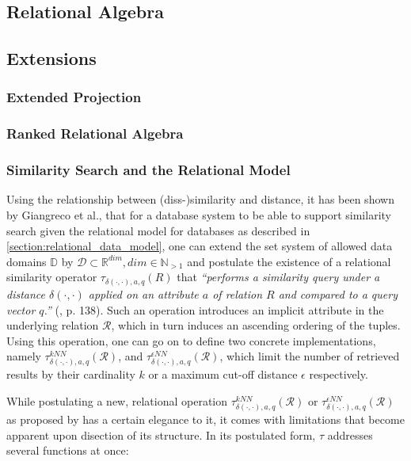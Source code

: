 \subsection{Relational Algebra}
\label{section:rel_algebra}

\subsection{Extensions}
\label{section:rel_extensions}


\subsubsection{Extended Projection}

\subsubsection{Ranked Relational Algebra}

\subsubsection{Similarity Search and the Relational Model}

Using the relationship between (diss-)similarity and distance, it has been shown by Giangreco et al., that for a database system to be able to support similarity search given the relational model for databases as described in \cref{section:relational_data_model}, one can extend the set system of allowed data domains $\mathbb{D}$ by $\mathcal{D} \subset \mathbb{R}^{dim}, dim \in \mathbb{N}_{>1}$ and postulate the existence of a relational similarity operator $\tau_{\delta(\cdot,\cdot),a,q}(R)$ that \emph{``performs a similarity query under a distance $\delta(\cdot,\cdot)$ applied on an attribute $a$ of relation $R$ and compared to a query vector $q$.''} (\cite{Giangreco:2018thesis}, p. 138). Such an operation introduces an implicit attribute in the underlying relation $\mathcal{R}$, which in turn induces an ascending ordering of the tuples. Using this operation, one can go on to define two concrete implementations, namely $\tau^{kNN}_{\delta(\cdot,\cdot),a,q}(\mathcal{R})$, and $\tau^{\epsilon NN}_{\delta(\cdot,\cdot),a,q}(\mathcal{R})$, which limit the number of retrieved results by their cardinality $k$ or a maximum cut-off distance $\epsilon$ respectively.

While postulating a new, relational operation $\tau^{kNN}_{\delta(\cdot,\cdot),a,q}(\mathcal{R})$ or $\tau^{\epsilon NN}_{\delta(\cdot,\cdot),a,q}(\mathcal{R})$ as proposed by \cite{Giangreco:2018thesis} has a certain elegance to it, it comes with limitations that become apparent upon disection of its structure. In its postulated form, $\tau$ addresses several functions at once:

